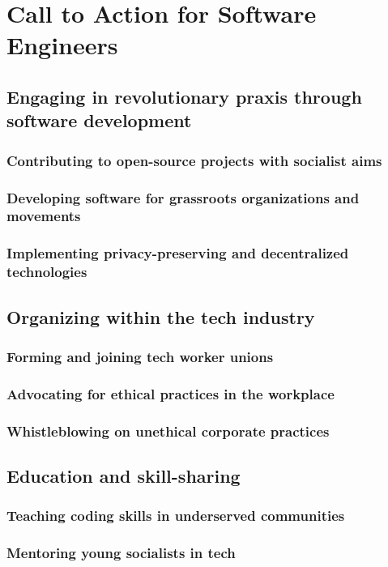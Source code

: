 \newpage

\section{Call to Action for Software Engineers}
\subsection{Engaging in revolutionary praxis through software development}
\subsubsection{Contributing to open-source projects with socialist aims}
\subsubsection{Developing software for grassroots organizations and movements}
\subsubsection{Implementing privacy-preserving and decentralized technologies}
\subsection{Organizing within the tech industry}
\subsubsection{Forming and joining tech worker unions}
\subsubsection{Advocating for ethical practices in the workplace}
\subsubsection{Whistleblowing on unethical corporate practices}
\subsection{Education and skill-sharing}
\subsubsection{Teaching coding skills in underserved communities}
\subsubsection{Mentoring young socialists in tech}
